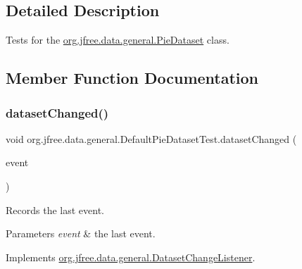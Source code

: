 \subsection{Detailed Description}
Tests for the \mbox{\hyperlink{interfaceorg_1_1jfree_1_1data_1_1general_1_1_pie_dataset}{org.\+jfree.\+data.\+general.\+Pie\+Dataset}} class. 

\subsection{Member Function Documentation}
\mbox{\label{classorg_1_1jfree_1_1data_1_1general_1_1_default_pie_dataset_test_a75f7f7699640f9c594fe0ff43aae0e83}} 
\subsubsection{\texorpdfstring{dataset\+Changed()}{datasetChanged()}}
{\footnotesize\ttfamily void org.\+jfree.\+data.\+general.\+Default\+Pie\+Dataset\+Test.\+dataset\+Changed (\begin{DoxyParamCaption}\item[{\mbox{\hyperlink{classorg_1_1jfree_1_1data_1_1general_1_1_dataset_change_event}{Dataset\+Change\+Event}}}]{event }\end{DoxyParamCaption})}

Records the last event.


\begin{DoxyParams}{Parameters}
{\em event} & the last event. \\
\hline
\end{DoxyParams}


Implements \mbox{\hyperlink{interfaceorg_1_1jfree_1_1data_1_1general_1_1_dataset_change_listener_a26ca53969f0dfa539f52e846a3cd72fe}{org.\+jfree.\+data.\+general.\+Dataset\+Change\+Listener}}.

\mbox{\label{classorg_1_1jfree_1_1data_1_1general_1_1_default_pie_dataset_test_aee5a093a704c1791fe451f36e6119814}} 
